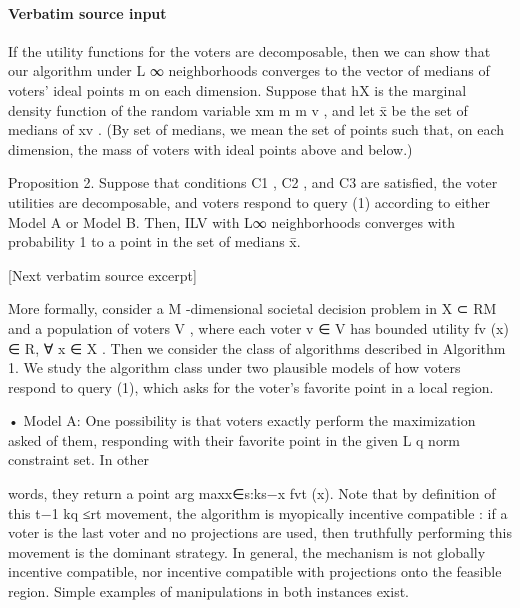 \documentclass[10pt]{article}
\begin{document}
\paragraph{Verbatim source input}
\begin{ReviewVerbatim}
If the utility functions for the voters are decomposable, then we can show that our
algorithm under L
                   ∞ neighborhoods converges to the vector of medians of voters' ideal points
                                    m
on each dimension. Suppose that hX is the marginal density function of the random variable
xm             m                          m
 v , and let x̄ be the set of medians of xv . (By   set of medians, we mean the set of points
such that, on each dimension, the mass of voters with ideal points above and below.)


Proposition 2. Suppose that conditions C1 , C2 , and C3 are satisfied, the voter utilities
are decomposable, and voters respond to query (1) according to either Model A or Model
B. Then, ILV with L∞ neighborhoods converges with probability 1 to a point in the set of
medians x̄.

[Next verbatim source excerpt]

   More formally, consider a M -dimensional societal decision problem in X  ⊂ RM and a
population of voters V , where each voter v ∈ V has bounded utility fv (x) ∈ R, ∀ x ∈ X .
Then we consider the class of algorithms described in Algorithm 1. We study the algorithm
class under two plausible models of how voters respond to query (1), which asks for the
voter's favorite point in a local region.



• Model A:       One possibility is that voters exactly perform the maximization asked of
  them, responding with their favorite point in the given L
                                                                       q norm constraint set. In other

  words, they return a point arg maxx∈{s:ks−x                    fvt (x). Note that by definition of this
                                                  t−1 kq ≤rt }
  movement, the algorithm is     myopically incentive compatible : if a voter is the last voter
  and no projections are used, then truthfully performing this movement is the dominant
  strategy.   In general, the mechanism is not globally incentive compatible, nor incentive
  compatible with projections onto the feasible region. Simple examples of manipulations
  in both instances exist.




\end{ReviewVerbatim}
\end{document}
